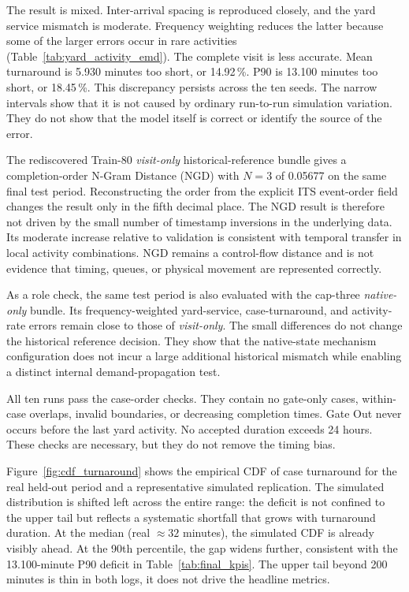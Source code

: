 The result is mixed. Inter-arrival spacing is reproduced closely, and the yard
service mismatch is moderate. Frequency weighting reduces the latter because
some of the larger errors occur in rare activities
(Table~\ref{tab:yard_activity_emd}). The complete visit is less accurate. Mean
turnaround is 5.930 minutes too short, or 14.92\,\%. P90 is 13.100 minutes too
short, or 18.45\,\%. This discrepancy persists across the ten seeds. The narrow
intervals show that it is not caused by ordinary run-to-run simulation
variation. They do not show that the model itself is correct or identify the
source of the error.

The rediscovered Train-80 \textit{visit-only} historical-reference bundle gives
a completion-order N-Gram Distance
(NGD) with $N=3$ of 0.05677 on the same final test period. Reconstructing the
order from the explicit ITS event-order field changes the result only in the
fifth decimal place. The NGD result is therefore not driven by the small number
of timestamp inversions in the underlying data. Its moderate increase relative
to validation is consistent with temporal transfer in local activity
combinations. NGD remains a control-flow distance and is not evidence that
timing, queues, or physical movement are represented correctly.

As a role check, the same test period is also evaluated with the cap-three
\textit{native-only} bundle. Its frequency-weighted yard-service,
case-turnaround, and activity-rate errors remain close to those of
\textit{visit-only}. The small differences do not change the historical
reference decision. They show that the native-state mechanism configuration does not
incur a large additional historical mismatch while enabling a distinct internal
demand-propagation test.

All ten runs pass the case-order checks. They contain no gate-only cases,
within-case overlaps, invalid boundaries, or decreasing completion times. Gate
Out never occurs before the last yard activity. No accepted duration exceeds
24 hours. These checks are necessary, but they do not remove the timing bias.

Figure~\ref{fig:cdf_turnaround} shows the empirical CDF of case turnaround
for the real held-out period and a representative simulated replication. The
simulated distribution is shifted left across the entire range: the deficit is
not confined to the upper tail but reflects a systematic shortfall that grows
with turnaround duration. At the median (real $\approx32$ minutes), the
simulated CDF is already visibly ahead. At the 90th percentile, the gap
widens further, consistent with the 13.100-minute P90 deficit in
Table~\ref{tab:final_kpis}. The upper tail beyond 200 minutes is thin in both
logs, it does not drive the headline metrics.

